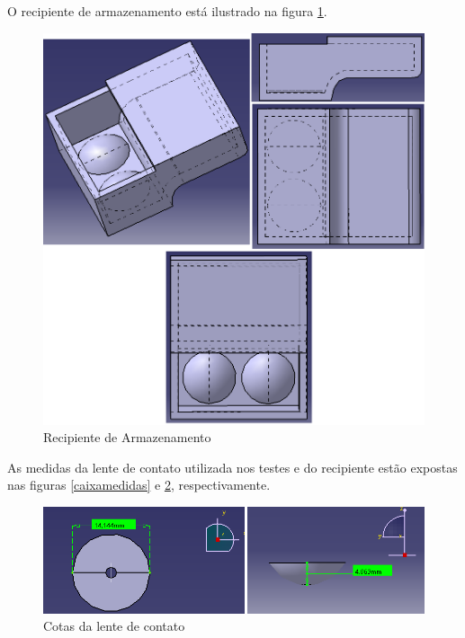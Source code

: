 O recipiente de armazenamento está ilustrado na figura \ref{fig30}.

\begin{figure}[H]
		\centering
			\includegraphics[scale= 0.6]{figuras/recipiente.png}
		\caption{Recipiente de Armazenamento}
		\label{fig30}
\end{figure}

As medidas da lente de contato utilizada nos testes e do recipiente estão expostas nas figuras \ref{caixamedidas} e \ref{lentemedidas}, respectivamente.


\begin{figure}[htb]
		\centering
			\includegraphics[scale=0.6]{figuras/lentemedidas.png}
		\caption{Cotas da lente de contato}
		\label{lentemedidas}
\end{figure}

